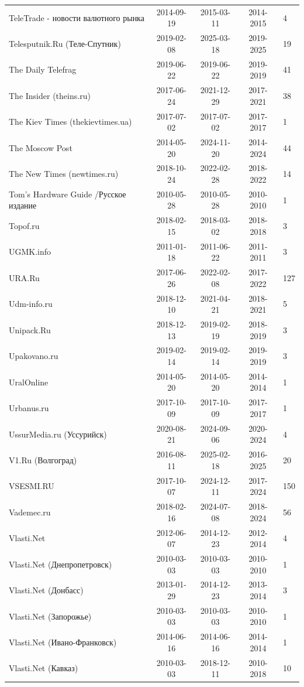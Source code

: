 \begin{longtable}{p{6cm}cccp{2cm}}
TeleTrade - новости валютного рынка & 2014-09-19 & 2015-03-11 & 2014-2015 & 4\\
Telesputnik.Ru (Теле-Спутник) & 2019-02-08 & 2025-03-18 & 2019-2025 & 19\\
The Daily Telefrag & 2019-06-22 & 2019-06-22 & 2019-2019 & 41\\
The Insider (theins.ru) & 2017-06-24 & 2021-12-29 & 2017-2021 & 38\\
The Kiev Times (thekievtimes.ua) & 2017-07-02 & 2017-07-02 & 2017-2017 & 1\\
The Moscow Post & 2014-05-20 & 2024-11-20 & 2014-2024 & 44\\
The New Times (newtimes.ru) & 2018-10-24 & 2022-02-28 & 2018-2022 & 14\\
Tom's Hardware Guide /Русское издание & 2010-05-28 & 2010-05-28 & 2010-2010 & 1\\
Topof.ru & 2018-02-15 & 2018-03-02 & 2018-2018 & 3\\
UGMK.info & 2011-01-18 & 2011-06-22 & 2011-2011 & 3\\
URA.Ru & 2017-06-26 & 2022-02-08 & 2017-2022 & 127\\
Udm-info.ru & 2018-12-10 & 2021-04-21 & 2018-2021 & 5\\
Unipack.Ru & 2018-12-13 & 2019-02-19 & 2018-2019 & 3\\
Upakovano.ru & 2019-02-14 & 2019-02-14 & 2019-2019 & 3\\
UralOnline & 2014-05-20 & 2014-05-20 & 2014-2014 & 1\\
Urbanus.ru & 2017-10-09 & 2017-10-09 & 2017-2017 & 1\\
UssurMedia.ru (Уссурийск) & 2020-08-21 & 2024-09-06 & 2020-2024 & 4\\
V1.Ru (Волгоград) & 2016-08-11 & 2025-02-18 & 2016-2025 & 20\\
VSESMI.RU & 2017-10-07 & 2024-12-11 & 2017-2024 & 150\\
Vademec.ru & 2018-02-16 & 2024-07-08 & 2018-2024 & 56\\
Vlasti.Net & 2012-06-07 & 2014-12-23 & 2012-2014 & 4\\
Vlasti.Net (Днепропетровск) & 2010-03-03 & 2010-03-03 & 2010-2010 & 1\\
Vlasti.Net (Донбасс) & 2013-01-29 & 2014-12-23 & 2013-2014 & 3\\
Vlasti.Net (Запорожье) & 2010-03-03 & 2010-03-03 & 2010-2010 & 1\\
Vlasti.Net (Ивано-Франковск) & 2014-06-16 & 2014-06-16 & 2014-2014 & 1\\
Vlasti.Net (Кавказ) & 2010-03-03 & 2018-12-11 & 2010-2018 & 10\\

\end{longtable}
